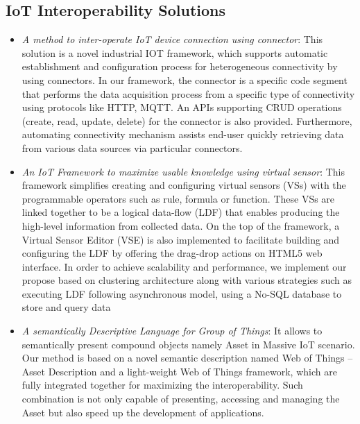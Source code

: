 \subsection{IoT Interoperability Solutions}
\begin{itemize}

\item \textit{A method to inter-operate IoT device connection using connector}: This solution is a novel industrial IOT framework, which supports automatic establishment and configuration process for heterogeneous connectivity by using connectors. In our framework, the connector is a specific code segment that performs the data acquisition process from a specific type of connectivity using protocols like HTTP, MQTT. An APIs supporting CRUD operations (create, read, update, delete) for the connector is also provided. Furthermore, automating connectivity mechanism assists end-user quickly retrieving data from various data sources via particular connectors.

\item \textit{An IoT Framework to maximize usable knowledge using virtual sensor}: This framework simplifies creating and configuring virtual sensors (VSs) with the programmable operators such as rule, formula or function. These VSs are linked together to be a logical data-flow (LDF) that enables producing the high-level information from collected data. On the top of the framework, a Virtual Sensor Editor (VSE) is also implemented to facilitate building and configuring the LDF by offering the drag-drop actions on HTML5 web interface. In order to achieve scalability and performance, we implement our propose based on clustering architecture along with various strategies such as executing LDF following asynchronous model, using a No-SQL database to store and query data

\item \textit{A semantically Descriptive Language for Group of Things}: It allows to semantically present compound objects namely Asset in Massive IoT scenario. Our method is based on a novel semantic description named Web of Things – Asset Description and a light-weight Web of Things framework, which are fully integrated together for maximizing the interoperability. Such combination is not only capable of presenting, accessing and managing the Asset but also speed up the development of applications.

\end{itemize}

